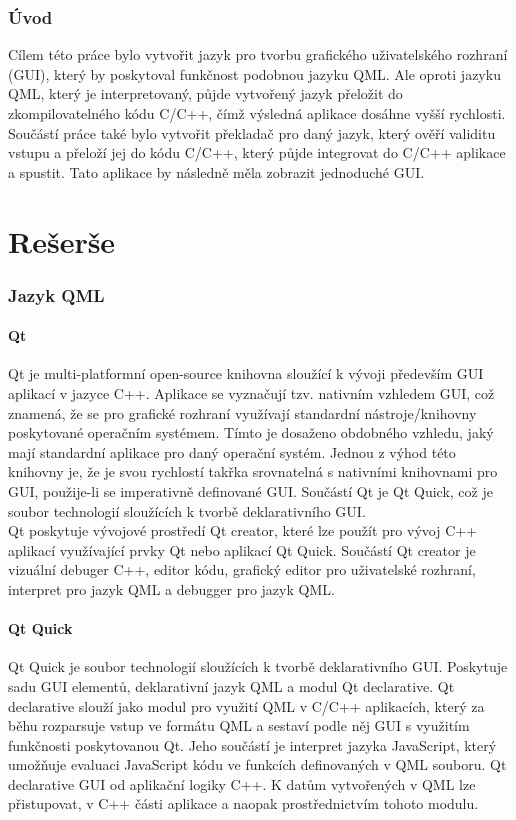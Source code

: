 \documentclass[report,11pt]{elsarticle}
\begin{document}
\section{\label{SEC:Intro}Úvod}
Cílem této práce bylo vytvořit jazyk pro tvorbu grafického uživatelského rozhraní (GUI), který by poskytoval funkčnost podobnou jazyku QML. Ale oproti jazyku QML, který je interpretovaný, půjde vytvořený jazyk přeložit do zkompilovatelného kódu C/C++, čímž výsledná aplikace dosáhne vyšší rychlosti. Součástí práce také bylo vytvořit překladač pro daný jazyk, který ověří validitu vstupu a přeloží jej do kódu C/C++, který půjde integrovat do  C/C++ aplikace a spustit. Tato aplikace by následně měla zobrazit jednoduché GUI.



\part{\label{CH:aa}Rešerše}

\section{\label{SEC:QML}Jazyk QML}
\subsection{Qt}
Qt je multi-platformní open-source knihovna sloužící k vývoji především GUI aplikací v jazyce C++. Aplikace se vyznačují tzv. nativním vzhledem GUI, což znamená, že se pro grafické rozhraní využívají standardní nástroje/knihovny poskytované operačním systémem. Tímto je dosaženo obdobného vzhledu, jaký mají standardní aplikace pro daný operační systém. Jednou z výhod této knihovny je, že je svou rychlostí takřka srovnatelná s nativními knihovnami pro GUI, použije-li se imperativně definované GUI. Součástí Qt je Qt Quick, což je soubor technologií sloužících k tvorbě deklarativního GUI.\\
Qt poskytuje vývojové prostředí Qt creator, které lze použít pro vývoj C++ aplikací využívající prvky Qt nebo aplikací Qt Quick. Součástí Qt creator je vizuální debuger C++, editor kódu, grafický editor pro uživatelské rozhraní, interpret pro jazyk QML a debugger pro jazyk QML.

\subsection{Qt Quick}
Qt Quick je soubor technologií sloužících k tvorbě deklarativního GUI. Poskytuje sadu GUI elementů, deklarativní jazyk QML a modul Qt declarative. Qt declarative slouží jako modul pro využití QML v C/C++ aplikacích, který za běhu rozparsuje vstup ve formátu QML a sestaví podle něj GUI s využitím funkčnosti poskytovanou Qt. Jeho součástí je interpret jazyka JavaScript, který umožňuje evaluaci JavaScript kódu ve funkcích definovaných v QML souboru. Qt declarative GUI od aplikační logiky C++. K datům vytvořených v QML lze přistupovat, v C++ části aplikace a naopak prostřednictvím tohoto modulu.
\end{document}
